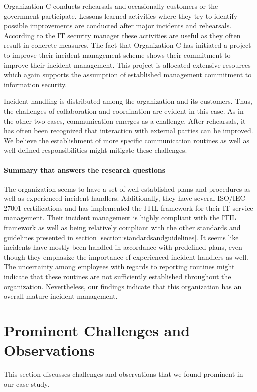 Organization C conducts rehearsals and occasionally customers or the government participate. Lessons learned activities where they try to identify possible improvements are conducted after major incidents and rehearsals. According to the IT security manager these activities are useful as they often result in concrete measures. The fact that Organization C has initiated a project to improve their incident management scheme shows their commitment to improve their incident management. This project is allocated extensive resources which again supports the assumption of established management commitment to information security.

Incident handling is distributed among the organization and its customers. Thus, the challenges of collaboration and coordination are evident in this case. As in the other two cases, communication emerges as a challenge. After rehearsals, it has often been recognized that interaction with external parties can be improved. We believe the establishment of more specific communication routines as well as well defined responsibilities might mitigate these challenges.

\paragraph{Summary that answers the research questions}
The organization seems to have a set of well established plans and procedures as well as experienced incident handlers. Additionally, they have several ISO/IEC 27001 certifications and has implemented the ITIL framework for their IT service management. Their incident management is highly compliant with the ITIL framework as well as being relatively compliant with the other standards and guidelines presented in section \ref{section:standardsandguidelines}. It seems like incidents have mostly been handled in accordance with predefined plans, even though they emphasize the importance of experienced incident handlers as well. The uncertainty among employees with regards to reporting routines might indicate that these routines are not sufficiently established throughout the organization. Nevertheless, our findings indicate that this organization has an overall mature incident management. 

\section{Prominent Challenges and Observations}
\label{sec:discussionStructures}
This section discusses challenges and observations that we found prominent in our case study.

